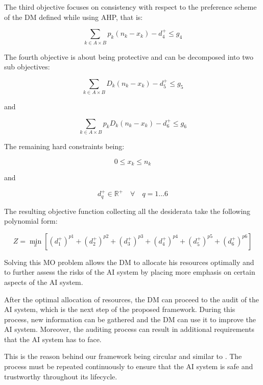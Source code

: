 The third objective focuses on consistency with respect to the preference scheme of the DM defined while using AHP, that is:

\begin{equation}
\sum_{k \in A \times B}  p_k(n_{k} - x_{k}) - d_4^+ \leq g_4
\end{equation}

The fourth objective is about being protective and can be decomposed into two sub objectives:

\begin{equation}
\sum_{k \in A \times B} D_k(n_{k} - x_{k}) - d_5^+ \leq g_5
\end{equation}

and 

\begin{equation}
\sum_{k \in A \times B} p_k D_k (n_{k} - x_{k}) - d_6^+ \leq g_6
\end{equation}

The remaining hard constraints being:

\begin{equation}
0 \leq x_k \leq n_k
\end{equation}

and

\begin{equation}
d_q^+ \in \mathbb{R^+} \quad \forall \quad q=1\dots6
\end{equation}

The resulting objective function collecting all the desiderata take the following polynomial form:

\begin{equation}
    Z =  \min_{x} [(d_1^+)^{p1} + (d_2^+)^{p2} + (d_3^+)^{p3} + (d_4^+)^{p4} + (d_5^+)^{p5} + (d_6^+)^{p6}]
\end{equation}

Solving this MO problem allows the DM to allocate his resources optimally and to further assess the risks of the AI system by placing more emphasis on certain aspects of the AI system.

After the optimal allocation of resources, the DM can proceed to the audit of the AI system, which is the next step of the proposed framework.
During this process, new information can be gathered and the DM can use it to improve the AI system.
Moreover, the auditing process can result in additional requirements that the AI system has to face.

This is the reason behind our framework being circular and similar to \cite{zicari_2021}.
The process must be repeated continuously to ensure that the AI system is safe and trustworthy throughout its lifecycle.